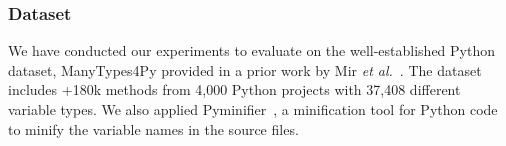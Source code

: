 

\subsubsection*{Dataset} We have conducted our experiments to evaluate {\tool} on the
well-established Python dataset, ManyTypes4Py provided in a prior work
by Mir {\em et al.}~\cite{mir2021manytypes4py}. The dataset includes
+180k methods from 4,000 Python projects with 37,408 different
variable types. We also applied Pyminifier~\cite{pyminifier}, a
minification tool for Python code to minify the variable names in 
the source files.

